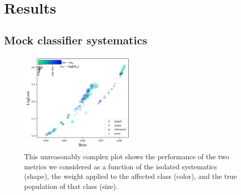 \section{Results}
\label{sec:results}



\subsection{Mock classifier systematics}
\label{sec:mockresults}

\begin{figure}
	\begin{center}
		\includegraphics[width=0.5\textwidth]{./fig/all_effects_isolated.png}
		\caption{This unreasonably complex plot shows the performance of the two metrics we considered as a function of the isolated systematics (shape), the weight applied to the affected class (color), and the true population of that class (size).}
		\label{fig:plasticc_all}
	\end{center}
\end{figure}

%


